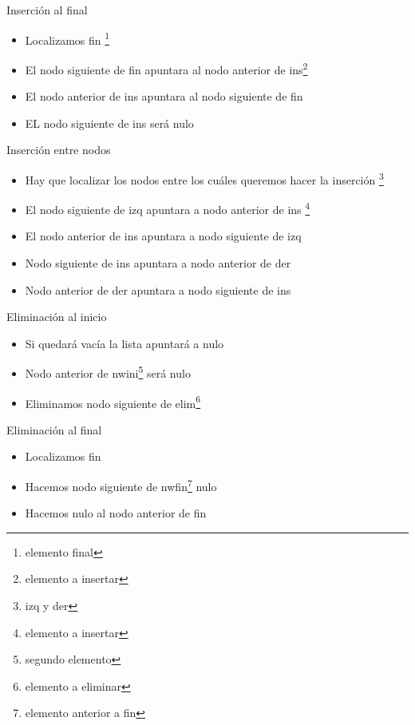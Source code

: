 \documentclass{beamer}
\begin{document}
\begin{frame}{Inserci\'on al final}
	\begin{itemize}
		\item Localizamos fin \footnote{elemento final}
		\item El nodo siguiente de fin apuntara al nodo anterior de ins\footnote{elemento a insertar}
		\item El nodo anterior de ins apuntara al nodo siguiente de fin
		\item EL nodo siguiente de ins ser\'a nulo
	\end{itemize}
\end{frame}

\begin{frame}{Inserci\'on entre nodos}
	\begin{itemize}
		\item Hay que localizar los nodos entre los cu\'ales queremos hacer la inserci\'on \footnote{izq y der}
		\item El nodo siguiente de izq apuntara a nodo anterior de ins \footnote{elemento a insertar}
		\item El nodo anterior de ins apuntara a nodo siguiente de izq
		\item Nodo siguiente de ins apuntara a nodo anterior de der
		\item Nodo anterior de der apuntara a nodo siguiente de ins
	\end{itemize}
\end{frame}

\begin{frame}{Eliminaci\'on al inicio}
	\begin{itemize}
		\item Si quedar\'a vac\'ia la lista apuntar\'a a nulo
		\item Nodo anterior de nwini\footnote{segundo elemento} ser\'a nulo 
		\item Eliminamos nodo siguiente de elim\footnote{elemento a eliminar}
	\end{itemize}
\end{frame}

\begin{frame}{Eliminaci\'on al final}
	\begin{itemize}
		\item Localizamos fin
		\item Hacemos nodo siguiente de nwfin\footnote{elemento anterior a fin} nulo
		\item Hacemos nulo al nodo anterior de fin
	\end{itemize}
\end{frame}
\end{document}
